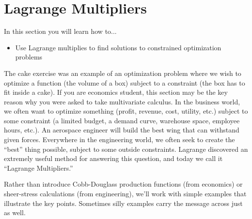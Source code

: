 \documentclass[10pt,]{book}
\theoremstyle{plain}
\theoremstyle{definition}
\theoremstyle{definition}
\theoremstyle{definition}
\theoremstyle{definition}
\theoremstyle{definition}
\numberwithin{equation}{section}
\begin{document}
\section[{Lagrange Multipliers}]{Lagrange Multipliers}\label{section-36}
In this section you will learn how to... \leavevmode%
\begin{itemize}[label=\textbullet]
\item{}Use Lagrange multiplies to find solutions to constrained optimization problems%
\end{itemize}
%
\par
The cake exercise was an example of an optimization problem where we wish to optimize a function (the volume of a box) subject to a constraint (the box has to fit inside a cake). If you are economics student, this section may be the key reason why you were asked to take multivariate calculus. In the business world, we often want to optimize something (profit, revenue, cost, utility, etc.) subject to some constraint (a limited budget, a demand curve, warehouse space, employee hours, etc.). An aerospace engineer will build the best wing that can withstand given forces. Everywhere in the engineering world, we often seek to create the ``best'' thing possible, subject to some outside constraints. Lagrange discovered an extremely useful method for answering this question, and today we call it ``Lagrange Multipliers.'' %
\par
Rather than introduce Cobb-Douglass production functions (from economics) or sheer-stress calculations (from engineering), we'll work with simple examples that illustrate the key points. Sometimes silly examples carry the message across just as well.%
\end{document}
